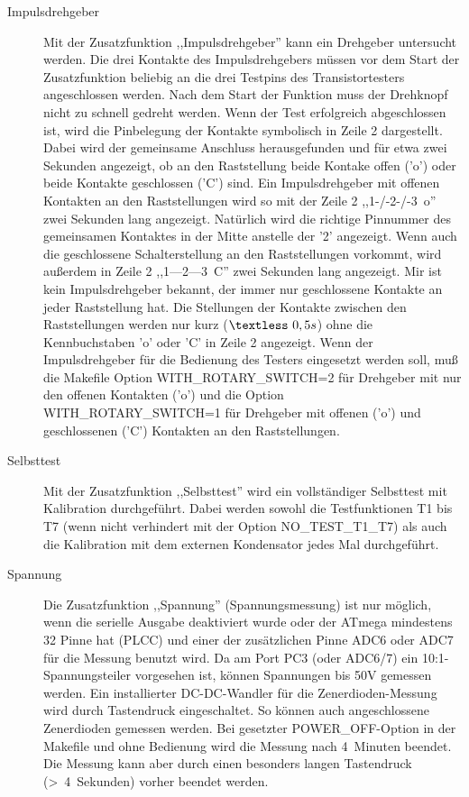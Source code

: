 \begin{description}
 \item[Impulsdrehgeber]
Mit der Zusatzfunktion ,,Impulsdrehgeber'' kann ein Drehgeber untersucht werden.
Die drei Kontakte des Impulsdrehgebers müssen vor dem Start der Zusatzfunktion beliebig an die drei Testpins
 des Transistortesters angeschlossen werden.
Nach dem Start der Funktion muss der Drehknopf nicht zu schnell gedreht werden.
Wenn der Test erfolgreich abgeschlossen ist, wird die Pinbelegung der Kontakte symbolisch in Zeile 2 dargestellt.
Dabei wird der gemeinsame Anschluss herausgefunden und für etwa zwei Sekunden angezeigt,
ob an den Raststellung beide Kontake offen ('o') oder beide Kontakte geschlossen ('C') sind.
Ein Impulsdrehgeber mit offenen Kontakten an den Raststellungen wird so mit der Zeile 2 ,,1-/-2-/-3~o'' zwei Sekunden lang angezeigt.
Natürlich wird die richtige Pinnummer des gemeinsamen Kontaktes in der Mitte anstelle der '2' angezeigt.
Wenn auch die geschlossene Schalterstellung an den Raststellungen vorkommt,
wird außerdem in Zeile 2 ,,1---2---3~C'' zwei Sekunden lang angezeigt.
Mir ist kein Impulsdrehgeber bekannt, der immer nur geschlossene Kontakte an jeder Raststellung hat.
Die Stellungen der Kontakte zwischen den Raststellungen werden nur kurz (\(\textless~0,5s\)) ohne die Kennbuchstaben 'o' oder 'C' 
in Zeile 2 angezeigt.
Wenn der Impulsdrehgeber für die Bedienung des Testers eingesetzt werden soll, muß die Makefile Option WITH\_ROTARY\_SWITCH=2
für Drehgeber mit nur den offenen Kontakten ('o') und die Option WITH\_ROTARY\_SWITCH=1 für Drehgeber mit
offenen ('o') und geschlossenen ('C') Kontakten an den Raststellungen.\\

 \item[Selbsttest]
Mit der Zusatzfunktion ,,Selbsttest'' wird ein vollständiger Selbsttest mit Kalibration durchgeführt.
Dabei werden sowohl die Testfunktionen T1 bis T7 (wenn nicht verhindert mit der Option NO\_TEST\_T1\_T7) 
als auch die Kalibration mit dem externen Kondensator jedes Mal durchgeführt.\\

 \item[Spannung]
Die Zusatzfunktion ,,Spannung'' (Spannungsmessung) ist nur möglich, wenn die serielle Ausgabe deaktiviert wurde
oder der ATmega mindestens 32 Pinne hat (PLCC) und einer der zusätzlichen Pinne ADC6 oder ADC7 für die Messung benutzt wird.
Da am Port PC3 (oder ADC6/7) ein 10:1-Spannungsteiler vorgesehen ist, können Spannungen bis 50V gemessen werden.
Ein installierter DC-DC-Wandler für die Zenerdioden-Messung wird durch Tastendruck eingeschaltet.
So können auch angeschlossene Zenerdioden gemessen werden.
Bei gesetzter POWER\_OFF-Option in der Makefile und ohne Bedienung wird die Messung nach 4~Minuten beendet.
Die Messung kann aber durch einen besonders langen Tastendruck (\textgreater~4~Sekunden) vorher beendet werden.\\


\end{description}
